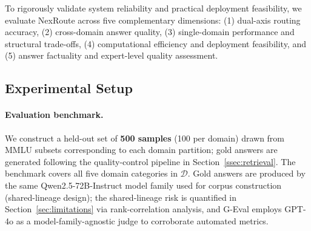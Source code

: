 \documentclass[a4paper,fleql]{cas-sc}
\begin{document}
To rigorously validate system reliability and practical deployment feasibility,
we evaluate NexRoute across five complementary dimensions:
(1) dual-axis routing accuracy,
(2) cross-domain answer quality,
(3) single-domain performance and structural trade-offs,
(4) computational efficiency and deployment feasibility, and
(5) answer factuality and expert-level quality assessment.

\subsection{Experimental Setup}
\label{ssec:setup}
\paragraph{Evaluation benchmark.}
We construct a held-out set of \textbf{500 samples} (100 per domain) drawn
from MMLU subsets corresponding to each domain partition; gold answers are
generated following the quality-control pipeline in Section~\ref{ssec:retrieval}.
The benchmark covers all five domain categories in $\mathcal{D}$.
Gold answers are produced by the same Qwen2.5-72B-Instruct model family
used for corpus construction (shared-lineage design); the shared-lineage
risk is quantified in Section~\ref{sec:limitations} via rank-correlation
analysis, and G-Eval employs GPT-4o as a model-family-agnostic judge to
corroborate automated metrics.
\end{document}
